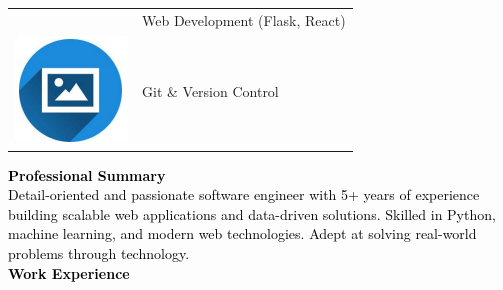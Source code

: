 \documentclass{article}
\begin{document}
\begin{paracol}{2}
\begin{tabular}{ll}
\begin{minipage}{0.1\linewidth}
         \end{minipage} & {{Web Development (Flask, React)}} \\[10pt]
         \begin{minipage}{0.1\linewidth}
         \includegraphics[width=\linewidth]{picon.png}
         \end{minipage} & {{Git \& Version Control}} \\[10pt]
        \end{tabular}
        
\switchcolumn
\color{black}

\textcolor{black}{\Large \textbf{Professional Summary}} \\

\textcolor{black}{Detail-oriented and passionate software engineer with 5+ years of experience building scalable web applications and data-driven solutions. Skilled in Python, machine learning, and modern web technologies. Adept at solving real-world problems through technology.}\\[8pt]

\textcolor{black}{\Large \textbf{Work Experience}} \\


\end{paracol}
\end{document}
